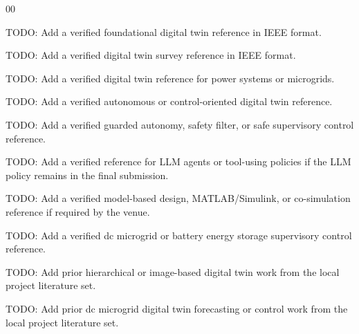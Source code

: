 \documentclass[conference]{IEEEtran}
\begin{document}
\begin{thebibliography}{00}

TODO: Add a verified foundational digital twin reference in IEEE format.

TODO: Add a verified digital twin survey reference in IEEE format.

TODO: Add a verified digital twin reference for power systems or microgrids.

TODO: Add a verified autonomous or control-oriented digital twin reference.

TODO: Add a verified guarded autonomy, safety filter, or safe supervisory
control reference.

TODO: Add a verified reference for LLM agents or tool-using policies if the
LLM policy remains in the final submission.

TODO: Add a verified model-based design, MATLAB/Simulink, or co-simulation
reference if required by the venue.

TODO: Add a verified dc microgrid or battery energy storage supervisory
control reference.

TODO: Add prior hierarchical or image-based digital twin work from the local
project literature set.

TODO: Add prior dc microgrid digital twin forecasting or control work from the
local project literature set.

\end{thebibliography}
\end{document}
